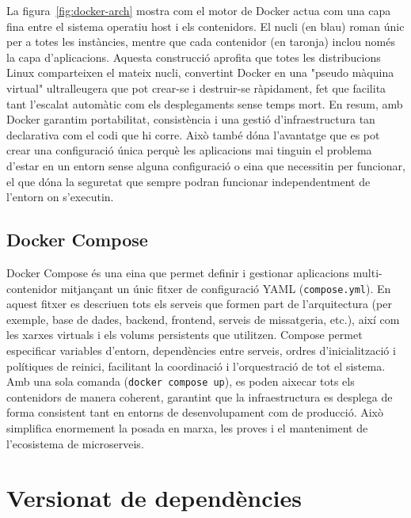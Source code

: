 La figura~\ref{fig:docker-arch} mostra com el motor de Docker actua com una capa fina entre el sistema operatiu host i els contenidors.  
El nucli (en blau) roman únic per a totes les instàncies, mentre que cada contenidor (en taronja) inclou només la capa d'aplicacions.  
Aquesta construcció aprofita que totes les distribucions Linux comparteixen el mateix nucli, convertint Docker en una "pseudo màquina virtual" ultralleugera que pot crear-se i destruir-se ràpidament, fet que facilita tant l'escalat automàtic com els desplegaments sense temps mort.  
En resum, amb Docker garantim portabilitat, consistència i una gestió d'infraestructura tan declarativa com el codi que hi corre. Això també dóna l'avantatge que es pot crear una configuració única perquè les aplicacions mai tinguin el problema d'estar en un entorn sense alguna configuració o eina que necessitin per funcionar, el que dóna la seguretat que sempre podran funcionar independentment de l'entorn on s'executin.

\subsection*{Docker Compose}
Docker Compose és una eina que permet definir i gestionar aplicacions multi-contenidor mitjançant un únic fitxer de configuració YAML (\texttt{compose.yml}). En aquest fitxer es descriuen tots els serveis que formen part de l'arquitectura (per exemple, base de dades, backend, frontend, serveis de missatgeria, etc.), així com les xarxes virtuals i els volums persistents que utilitzen. Compose permet especificar variables d'entorn, dependències entre serveis, ordres d'inicialització i polítiques de reinici, facilitant la coordinació i l'orquestració de tot el sistema. Amb una sola comanda (\texttt{docker compose up}), es poden aixecar tots els contenidors de manera coherent, garantint que la infraestructura es desplega de forma consistent tant en entorns de desenvolupament com de producció. Això simplifica enormement la posada en marxa, les proves i el manteniment de l'ecosistema de microserveis.

\section{Versionat de dependències}

